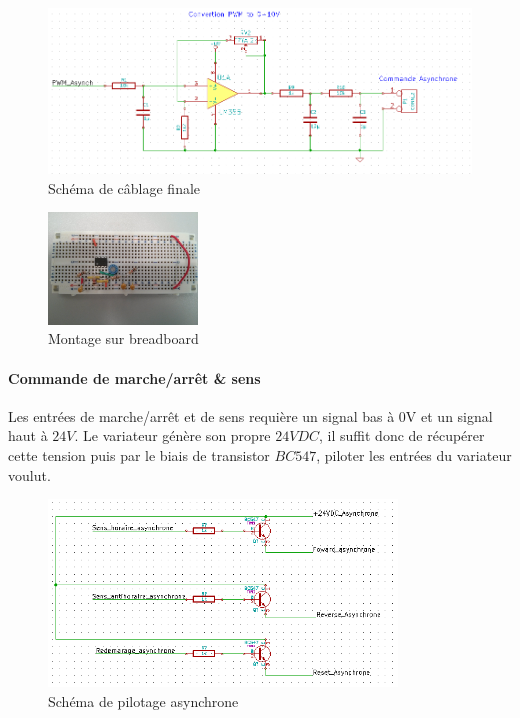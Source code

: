 \documentclass[11pt]{article}
\begin{document}
\begin{figure}[!h]
    \centering
    \includegraphics[width=500px]{schema_digt_anolog.png}
    \caption{Schéma de câblage finale}
\end{figure}
\FloatBarrier
\begin{figure}[!h]
    \centering
    \includegraphics[width=150px]{IMG_20160629_203955.jpg}
    \caption{Montage sur breadboard}
\end{figure}
\FloatBarrier
\paragraph{Commande de marche/arrêt \& sens\\}

Les entrées de marche/arrêt et de sens requière un signal bas à 0V et un signal haut à $24V$. Le variateur génère son propre $24VDC$, il suffit donc de récupérer cette tension puis par le biais de transistor $BC547$, piloter les entrées du variateur voulut.

\begin{figure}[!h]
    \centering
    \includegraphics[width=350px]{schema_pilotage_asynchrone.png}
    \caption{Schéma de pilotage asynchrone}
\end{figure}
\FloatBarrier
\end{document}
